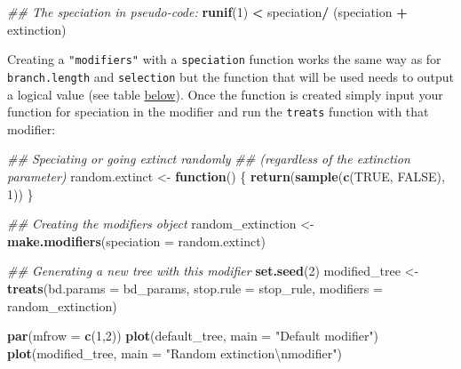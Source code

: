 \documentclass[
]{book}
\newenvironment{Shaded}{\begin{snugshade}}{\end{snugshade}}
\newcommand{\CharTok}[1]{\textcolor[rgb]{0.31,0.60,0.02}{#1}}
\newcommand{\CommentTok}[1]{\textcolor[rgb]{0.56,0.35,0.01}{\textit{#1}}}
\newcommand{\ControlFlowTok}[1]{\textcolor[rgb]{0.13,0.29,0.53}{\textbf{#1}}}
\newcommand{\DataTypeTok}[1]{\textcolor[rgb]{0.13,0.29,0.53}{#1}}
\newcommand{\DecValTok}[1]{\textcolor[rgb]{0.00,0.00,0.81}{#1}}
\newcommand{\KeywordTok}[1]{\textcolor[rgb]{0.13,0.29,0.53}{\textbf{#1}}}
\newcommand{\NormalTok}[1]{#1}
\newcommand{\OperatorTok}[1]{\textcolor[rgb]{0.81,0.36,0.00}{\textbf{#1}}}
\newcommand{\OtherTok}[1]{\textcolor[rgb]{0.56,0.35,0.01}{#1}}
\newcommand{\StringTok}[1]{\textcolor[rgb]{0.31,0.60,0.02}{#1}}
\begin{document}
\begin{Shaded}
\begin{Highlighting}[]
\CommentTok{\#\# The speciation in pseudo{-}code:}
\KeywordTok{runif}\NormalTok{(}\DecValTok{1}\NormalTok{) }\OperatorTok{\textless{}}\StringTok{ }\NormalTok{speciation}\OperatorTok{/}\StringTok{ }\NormalTok{(speciation }\OperatorTok{+}\StringTok{ }\NormalTok{extinction)}
\end{Highlighting}
\end{Shaded}

Creating a \texttt{"modifiers"} with a \texttt{speciation} function works the same way as for \texttt{branch.length} and \texttt{selection} but the function that will be used needs to output a logical value (see table \protect\hyperlink{summarymodifiers}{below}).
Once the function is created simply input your function for speciation in the modifier and run the \texttt{treats} function with that modifier:

\begin{Shaded}
\begin{Highlighting}[]
\CommentTok{\#\# Speciating or going extinct randomly}
\CommentTok{\#\# (regardless of the extinction parameter)}
\NormalTok{random.extinct  \textless{}{-}}\StringTok{ }\ControlFlowTok{function}\NormalTok{() \{}
    \KeywordTok{return}\NormalTok{(}\KeywordTok{sample}\NormalTok{(}\KeywordTok{c}\NormalTok{(}\OtherTok{TRUE}\NormalTok{, }\OtherTok{FALSE}\NormalTok{), }\DecValTok{1}\NormalTok{))}
\NormalTok{\}}

\CommentTok{\#\# Creating the modifiers object}
\NormalTok{random\_extinction \textless{}{-}}\StringTok{ }\KeywordTok{make.modifiers}\NormalTok{(}\DataTypeTok{speciation =}\NormalTok{ random.extinct)}

\CommentTok{\#\# Generating a new tree with this modifier}
\KeywordTok{set.seed}\NormalTok{(}\DecValTok{2}\NormalTok{)}
\NormalTok{modified\_tree \textless{}{-}}\StringTok{ }\KeywordTok{treats}\NormalTok{(}\DataTypeTok{bd.params =}\NormalTok{ bd\_params,}
                      \DataTypeTok{stop.rule =}\NormalTok{ stop\_rule,}
                      \DataTypeTok{modifiers =}\NormalTok{ random\_extinction)}

\KeywordTok{par}\NormalTok{(}\DataTypeTok{mfrow =} \KeywordTok{c}\NormalTok{(}\DecValTok{1}\NormalTok{,}\DecValTok{2}\NormalTok{))}
\KeywordTok{plot}\NormalTok{(default\_tree,  }\DataTypeTok{main =} \StringTok{"Default modifier"}\NormalTok{)}
\KeywordTok{plot}\NormalTok{(modified\_tree, }\DataTypeTok{main =} \StringTok{"Random extinction}\CharTok{\textbackslash{}n}\StringTok{modifier"}\NormalTok{)}
\end{Highlighting}
\end{Shaded}
\end{document}
